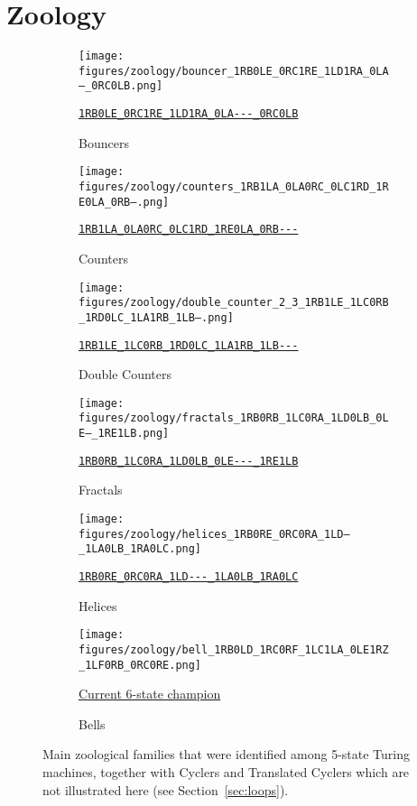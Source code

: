 \documentclass[a4paper,british]{article}
\theoremstyle{definition} %
\numberwithin{equation}{section}
\theoremstyle{definition} %
\newcommand{\tm}[1]{\href{https://bbchallenge.org/#1}{\texttt{\nolinkurl{#1}}}}
\begin{document}
\section{Zoology}\label{sec:zoo}
\vspace{-1em}
\begin{figure}[htbp]
    \centering

    \begin{subfigure}{0.3\textwidth}
        \centering
        \texttt{[image: figures/zoology/bouncer\_1RB0LE\_0RC1RE\_1LD1RA\_0LA---\_0RC0LB.png]}
        \caption*{Bouncers}
        {\scriptsize \tm{1RB0LE_0RC1RE_1LD1RA_0LA---_0RC0LB}}
    \end{subfigure}
    \hfill
    \begin{subfigure}{0.3\textwidth}
        \centering
        \texttt{[image: figures/zoology/counters\_1RB1LA\_0LA0RC\_0LC1RD\_1RE0LA\_0RB---.png]}
        \caption*{Counters}
        {\scriptsize \tm{1RB1LA_0LA0RC_0LC1RD_1RE0LA_0RB---}}
    \end{subfigure}
    \hfill
    \begin{subfigure}{0.3\textwidth}
        \centering
        \texttt{[image: figures/zoology/double\_counter\_2\_3\_1RB1LE\_1LC0RB\_1RD0LC\_1LA1RB\_1LB---.png]}
        \caption*{Double Counters}
        {\scriptsize \tm{1RB1LE_1LC0RB_1RD0LC_1LA1RB_1LB---}}
    \end{subfigure}

    \vspace{0.5cm}

    \begin{subfigure}{0.3\textwidth}
        \centering
        \texttt{[image: figures/zoology/fractals\_1RB0RB\_1LC0RA\_1LD0LB\_0LE---\_1RE1LB.png]}
        \caption*{Fractals}
        {\scriptsize \tm{1RB0RB_1LC0RA_1LD0LB_0LE---_1RE1LB}}
    \end{subfigure}
    \hfill
    \begin{subfigure}{0.3\textwidth}
        \centering
        \texttt{[image: figures/zoology/helices\_1RB0RE\_0RC0RA\_1LD---\_1LA0LB\_1RA0LC.png]}
        \caption*{Helices}
        {\scriptsize \tm{1RB0RE_0RC0RA_1LD---_1LA0LB_1RA0LC}}
    \end{subfigure}
    \hfill
    \begin{subfigure}{0.3\textwidth}
        \centering
        \texttt{[image: figures/zoology/bell\_1RB0LD\_1RC0RF\_1LC1LA\_0LE1RZ\_1LF0RB\_0RC0RE.png]}
        \caption*{Bells}
        {\scriptsize \href{https://bbchallenge.org/1RB0LD_1RC0RF_1LC1LA_0LE1RZ_1LF0RB_0RC0RE}{Current 6-state champion \cite{Pavel_discorvery}}}
    \end{subfigure}

    \caption{Main zoological families that were identified among 5-state Turing machines, together with Cyclers and Translated Cyclers which are not illustrated here (see Section~\ref{sec:loops}). }
    \label{fig:zoology}
\end{figure}
\end{document}
